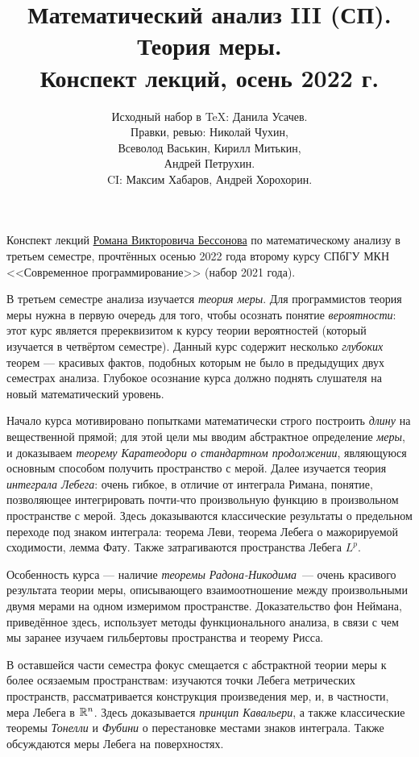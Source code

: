 \documentclass[a4paper,14pt]{extarticle}
\title{Математический анализ III (СП). \\ Теория меры. \\ Конспект лекций, осень 2022 г.}
\author{Исходный набор в \TeX: Данила Усачев. \\ Правки, ревью: Николай Чухин, \\ Всеволод Васькин, Кирилл Митькин, \\ Андрей Петрухин. \\ CI: Максим Хабаров, Андрей Хорохорин.}
\date{}
\theoremstyle{definition}
\theoremstyle{plain}
\theoremstyle{plain}
\theoremstyle{plain}
\theoremstyle{plain}
\theoremstyle{definition}
\theoremstyle{definition}
\theoremstyle{definition}
\theoremstyle{definition}
\theoremstyle{definition}
\theoremstyle{definition}
\theoremstyle{definition}
\theoremstyle{definition}
\theoremstyle{definition}
\theoremstyle{plain}
\theoremstyle{plain}
\theoremstyle{plain}
\theoremstyle{plain}
\theoremstyle{definition}
\theoremstyle{definition}
\theoremstyle{definition}
\theoremstyle{definition}
\theoremstyle{definition}
\theoremstyle{definition}
\newcommand{\R}{\ensuremath \mathbb{R}}
\begin{document}
\maketitle
\maketitle
Конспект лекций \href{https://math-cs.spbu.ru/people/bessonov-r-v/}{\color{blue}Романа Викторовича Бессонова} по математическому анализу в третьем семестре, прочтённых осенью 2022 года второму курсу СПбГУ МКН <<Современное программирование>> (набор 2021 года).

В третьем семестре анализа изучается \emph{теория меры}. Для программистов теория меры нужна в первую очередь для того, чтобы осознать понятие \textit{вероятности}: этот курс является пререквизитом к курсу теории вероятностей (который изучается в четвёртом семестре). Данный курс содержит несколько \textit{глубоких} теорем --- красивых фактов, подобных которым не было в предыдущих двух семестрах анализа. Глубокое осознание курса должно поднять слушателя на новый математический уровень.

Начало курса мотивировано попытками математически строго построить \emph{длину} на вещественной прямой; для этой цели мы вводим абстрактное определение \emph{меры}, и доказываем \emph{теорему Каратеодори о стандартном продолжении}, являющуюся основным способом получить пространство с мерой. Далее изучается теория \emph{интеграла Лебега}: очень гибкое, в отличие от интеграла Римана, понятие, позволяющее интегрировать почти-что произвольную функцию в произвольном пространстве с мерой. Здесь доказываются классические результаты о предельном переходе под знаком интеграла: теорема Леви, теорема Лебега о мажорируемой сходимости, лемма Фату. Также затрагиваются пространства Лебега $ L^{p} $.

Особенность курса --- наличие \emph{теоремы Радона-Никодима}~--- очень красивого результата теории меры, описывающего взаимоотношение между произвольными двумя мерами на одном измеримом пространстве. Доказательство фон Неймана, приведённое здесь, использует методы функционального анализа, в связи с чем мы заранее изучаем гильбертовы пространства и теорему Рисса.

В оставшейся части семестра фокус смещается с абстрактной теории меры к более осязаемым пространствам: изучаются точки Лебега метрических пространств, рассматривается конструкция произведения мер, и, в частности, мера Лебега в $ \R^{n} $. Здесь доказывается \emph{принцип Кавальери}, а также классические теоремы \emph{Тонелли} и \emph{Фубини} о перестановке местами знаков интеграла. Также обсуждаются меры Лебега на поверхностях.
\end{document}

